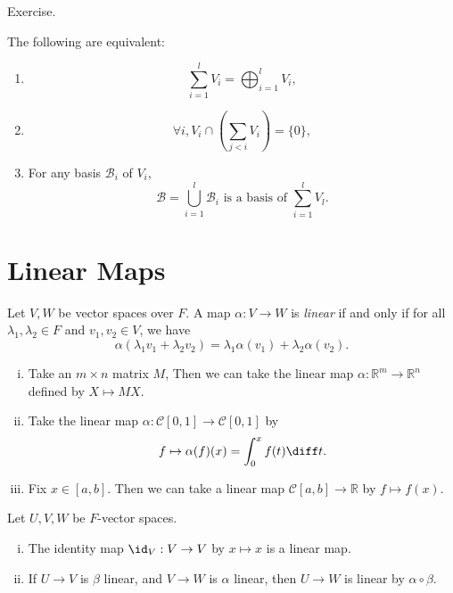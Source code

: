 \documentclass[12pt]{article}
\begin{document}
\begin{proofbox}
	Exercise.
\end{proofbox}

\begin{proposition}
	The following are equivalent:
	\begin{enumerate}[\normalfont(i)]
		\item
			\[
			\sum_{i = 1}^{l} V_i = \bigoplus_{i = 1}^{l} V_i
			,\]
		\item 
			\[
				\forall i, V_i \cap \left( \sum_{j < i} V_i \right) = \{0\}
			,\]
		\item For any basis $\mathcal{B}_i$ of $V_i$,
			\[
				\mathcal{B} = \bigcup_{i = 1}^{l} \mathcal{B}_i \text{ is a basis of } \sum_{i = 1}^{l} V_l
			.\]
	\end{enumerate}
	
\end{proposition}

\newpage

\section{Linear Maps}%
\label{sec:linear_maps}

\begin{definition}
	Let $V, W$ be vector spaces over $F$. A map $\alpha : V \to W$ is \textit{linear} if and only if for all $\lambda_1, \lambda_2 \in F$ and $v_1, v_2 \in V$, we have
	\[
		\alpha(\lambda_1 v_1 + \lambda_2 v_2) = \lambda_1 \alpha(v_1) + \lambda_2 \alpha(v_2)
	.\]
\end{definition}

\begin{exbox}
	\begin{enumerate}[(i)]
		\item Take an $m \times n$ matrix $M$, Then we can take the linear map $\alpha : \mathbb{R}^{m} \to \mathbb{R}^{n}$ defined by $X \mapsto M X$.
		\item Take the linear map $\alpha : \mathcal{C}[0, 1] \to \mathcal{C}[0, 1]$ by
			\[
				f \mapsto \alpha(f)(x) = \int_{0}^{x}f(t)\diff t
			.\]
		\item Fix $x \in [a, b]$. Then we can take a linear map $\mathcal{C}[a, b] \to \mathbb{R}$ by $f \mapsto f(x)$.
	\end{enumerate}

\end{exbox}

\begin{remark}
	Let $U, V, W$ be $F$-vector spaces.
	\begin{enumerate}[(i)]
		\item The identity map $\id_V : V \to V$ by $x \mapsto x$ is a linear map.
		\item If $U \to V$ is $\beta$ linear, and $V \to W$ is $\alpha$ linear, then $U \to W$ is linear by $\alpha \circ \beta$.
	\end{enumerate}
\end{remark}
\end{document}
